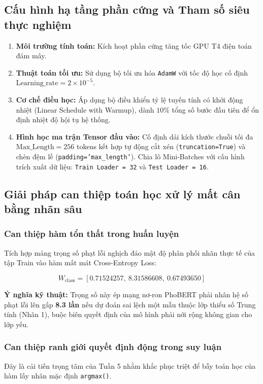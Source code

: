 \documentclass[conference,10pt,a4paper]{IEEEtran}
\begin{document}
\subsection{Cấu hình hạ tầng phần cứng và Tham số siêu thực nghiệm}
\begin{enumerate}
    \item \textbf{Môi trường tính toán:} Kích hoạt phần cứng tăng tốc GPU T4 điện toán đám mây.
    \item \textbf{Thuật toán tối ưu:} Sử dụng bộ tối ưu hóa \texttt{AdamW} với tốc độ học cố định $\text{Learning\_rate} = 2 \times 10^{-5}$.
    \item \textbf{Cơ chế điều học:} Áp dụng bộ điều khiển tỷ lệ tuyến tính có khởi động nhiệt (Linear Schedule with Warmup), dành $10\%$ tổng số bước đầu tiên để ổn định nhiệt độ hội tụ hệ thống.
    \item \textbf{Hình học ma trận Tensor đầu vào:} Cố định dải kích thước chuỗi tối đa $\text{Max\_Length} = 256$ tokens kết hợp tự động cắt xén (\texttt{truncation=True}) và chèn đệm lề (\texttt{padding='max\_length'}). Chia lô Mini-Batches với cấu hình trích xuất dữ liệu: \texttt{Train Loader = 32} và \texttt{Test Loader = 16}.
\end{enumerate}

\subsection{Giải pháp can thiệp toán học xử lý mất cân bằng nhãn sâu}

\subsubsection{Can thiệp hàm tổn thất trong huấn luyện}
Tích hợp mảng trọng số phạt lỗi nghịch đảo mật độ phân phối nhãn thực tế của tập Train vào hàm mất mát Cross-Entropy Loss:

$$W_{\text{class}} = [0.71524257, \ 8.31586608, \ 0.67493650]$$

\noindent \textbf{Ý nghĩa kỹ thuật:} Trọng số này ép mạng nơ-ron PhoBERT phải nhân hệ số phạt lỗi lên gấp \textbf{8.3 lần} nếu dự đoán sai lệch một mẫu thuộc lớp thiểu số Trung tính (Nhãn 1), buộc biên quyết định của mô hình phải nới rộng không gian cho lớp yếu.

\subsubsection{Can thiệp ranh giới quyết định động trong suy luận}
Đây là cải tiến trọng tâm của Tuần 5 nhằm khắc phục triệt để bẫy toán học của hàm lấy nhãn mặc định \texttt{argmax()}. 
\end{document}
